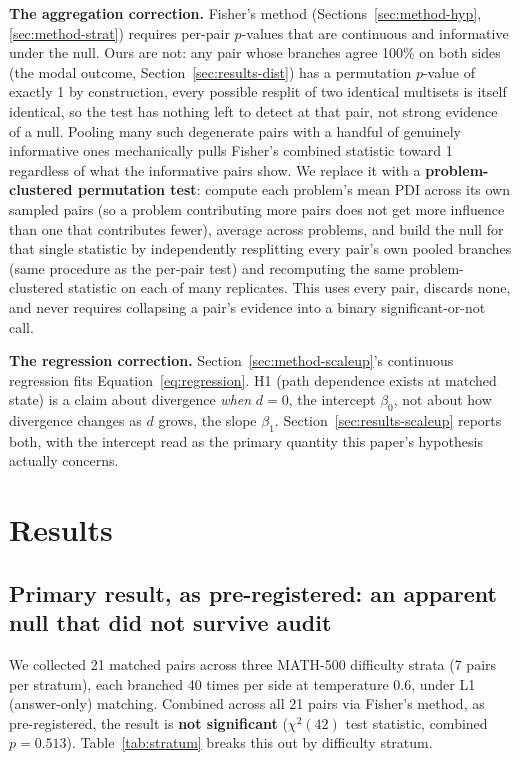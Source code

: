 \documentclass{article}
\begin{document}
\textbf{The aggregation correction.} Fisher's method (Sections~\ref{sec:method-hyp}, \ref{sec:method-strat}) requires per-pair $p$-values that are continuous and informative under the null. Ours are not: any pair whose branches agree 100\% on both sides (the modal outcome, Section~\ref{sec:results-dist}) has a permutation $p$-value of exactly 1 by construction, every possible resplit of two identical multisets is itself identical, so the test has nothing left to detect at that pair, not strong evidence of a null. Pooling many such degenerate pairs with a handful of genuinely informative ones mechanically pulls Fisher's combined statistic toward 1 regardless of what the informative pairs show. We replace it with a \textbf{problem-clustered permutation test}: compute each problem's mean PDI across its own sampled pairs (so a problem contributing more pairs does not get more influence than one that contributes fewer), average across problems, and build the null for that single statistic by independently resplitting every pair's own pooled branches (same procedure as the per-pair test) and recomputing the same problem-clustered statistic on each of many replicates. This uses every pair, discards none, and never requires collapsing a pair's evidence into a binary significant-or-not call.

\textbf{The regression correction.} Section~\ref{sec:method-scaleup}'s continuous regression fits Equation~\ref{eq:regression}. H1 (path dependence exists at matched state) is a claim about divergence \emph{when} $d=0$, the intercept $\beta_0$, not about how divergence changes as $d$ grows, the slope $\beta_1$. Section~\ref{sec:results-scaleup} reports both, with the intercept read as the primary quantity this paper's hypothesis actually concerns.

\section{Results}
\label{sec:results}

\subsection{Primary result, as pre-registered: an apparent null that did not survive audit}
\label{sec:results-primary}

We collected 21 matched pairs across three MATH-500 difficulty strata (7 pairs per stratum), each branched 40 times per side at temperature 0.6, under L1 (answer-only) matching. Combined across all 21 pairs via Fisher's method, as pre-registered, the result is \textbf{not significant} ($\chi^2(42)$ test statistic, combined $p=0.513$). Table~\ref{tab:stratum} breaks this out by difficulty stratum.
\end{document}
